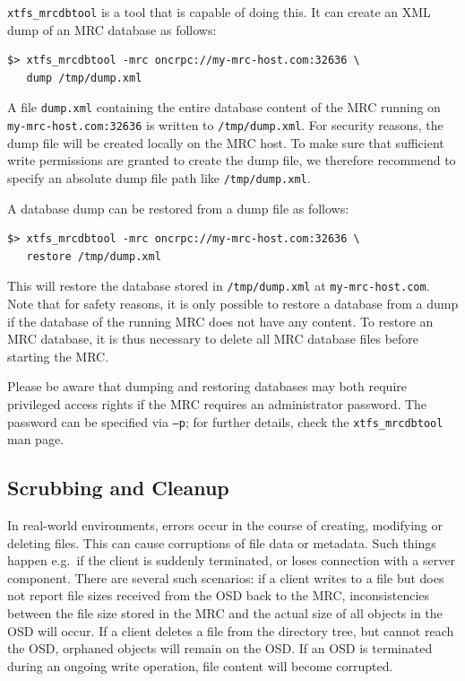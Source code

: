 \documentclass[a4paper,10pt]{book}
\begin{document}
\texttt{xtfs\_mrcdbtool} is a tool that is capable of doing this. It can create an XML dump of an MRC database as follows:

\begin{verbatim}
$> xtfs_mrcdbtool -mrc oncrpc://my-mrc-host.com:32636 \
   dump /tmp/dump.xml
\end{verbatim}

A file \texttt{dump.xml} containing the entire database content of the MRC running on \texttt{my-mrc-host.com:32636} is written to \texttt{/tmp/dump.xml}. For security reasons, the dump file will be created locally on the MRC host. To make sure that sufficient write permissions are granted to create the dump file, we therefore recommend to specify an absolute dump file path like \texttt{/tmp/dump.xml}.

A database dump can be restored from a dump file as follows:

\begin{verbatim}
$> xtfs_mrcdbtool -mrc oncrpc://my-mrc-host.com:32636 \
   restore /tmp/dump.xml
\end{verbatim}

This will restore the database stored in \texttt{/tmp/dump.xml} at \texttt{my-mrc-host.com}. Note that for safety reasons, it is only possible to restore a database from a dump if the database of the running MRC does not have any content. To restore an MRC database, it is thus necessary to delete all MRC database files before starting the MRC.

Please be aware that dumping and restoring databases may both require privileged access rights if the MRC requires an administrator password. The password can be specified via \texttt{--p}; for further details, check the \texttt{xtfs\_mrcdbtool} man page.

\subsection{Scrubbing and Cleanup}

In real-world environments, errors occur in the course of creating, modifying or deleting files. This can cause corruptions of file data or metadata. Such things happen e.g.\ if the client is suddenly terminated, or loses connection with a server component. There are several such scenarios: if a client writes to a file but does not report file sizes received from the OSD back to the MRC, inconsistencies between the file size stored in the MRC and the actual size of all objects in the OSD will occur. If a client deletes a file from the directory tree, but cannot reach the OSD, orphaned objects will remain on the OSD. If an OSD is terminated during an ongoing write operation, file content will become corrupted.
\end{document}
